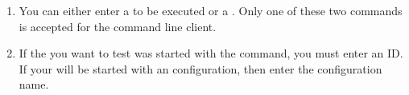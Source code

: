 \begin{enumerate}
	
 
\item You can either enter a \gdsuite{} to be executed or a \gdjob{}. Only one of these two commands is accepted for the command line client. 
\item If the \gdaut{} you want to test was started with the  command, you must enter an \gdaut{} ID. If your \gdaut{} will be started with an \gdaut{} configuration, then enter the configuration name. 


\end{enumerate}
